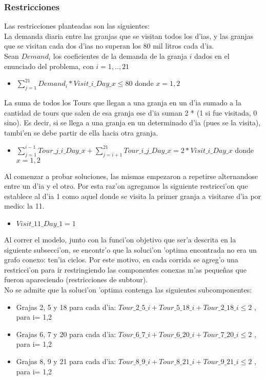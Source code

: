 \subsubsection{Restricciones}
Las restricciones planteadas son las siguientes: \\
La demanda diaria entre las granjas que se visitan todos los d'ias, y las granjas que se visitan cada dos d'ias no superan los 80 mil litros cada d'ia.\\
Sean $Demand_i$ los coeficientes de la demanda de la granja $i$ dados en el enunciado del problema, con $i= 1,..,21$
\begin{itemize}
\item $\sum_{j=1}^{21} Demand_i * Visit\_i\_Day\_x \leq 80$ donde $x = 1,2$
\end{itemize}
La suma de todos los Tours que llegan a una granja en un d'ia sumado a la cantidad de tours que salen de esa granja ese d'ia suman 2 * (1 si fue visitada, 0 sino). Es decir, si se llega a una granja en un determinado d'ia (pues se la visita), tambi'en se debe partir de ella hacia otra granja.
\begin{itemize}
\item $ \sum_{j = 1}^{i-1} Tour\_j\_i\_Day\_x + \sum_{j=i+1}^{21} Tour\_i\_j\_Day\_x = 2 * Visit\_i\_Day\_x$ donde $x = 1,2 $
\end{itemize}
Al comenzar a probar soluciones, las mismas empezaron a repetirse alternandose entre un d'ia y el otro. Por esta raz'on agregamos la siguiente restricci'on que establece al d'ia 1 como aquel donde se visita la primer granja a visitarse d'ia por medio: la 11.
\begin{itemize}
\item $ Visit\_11\_Day\_1 = 1$
\end{itemize}
Al correr el modelo, junto con la funci'on objetivo que ser'a descrita en la siguiente subsecci'on, se encontr'o que la soluci'on 'optima encontrada no era un grafo conexo: ten'ia ciclos. Por este motivo, en cada corrida se agreg'o una restricci'on para ir restringiendo las componentes conexas m'as peque\~nas que fueron apareciendo (restricciones de subtour). \\
No se admite que la soluci'on 'optima contenga las siguientes subcomponentes:
\begin{itemize}
\item Grajas 2, 5 y 18 para cada d'ia: $Tour\_2\_5\_i + Tour\_5\_18\_i + Tour\_2\_18\_i \leq 2$ , para i= 1,2
\item Grajas 6, 7 y 20 para cada d'ia: $Tour\_6\_7\_i + Tour\_6\_20\_i + Tour\_7\_20\_i \leq 2$ , para i= 1,2
\item Grajas 8, 9 y 21 para cada d'ia: $Tour\_8\_9\_i + Tour\_8\_21\_i + Tour\_9\_21\_i \leq 2$ , para i= 1,2
\end{itemize}
